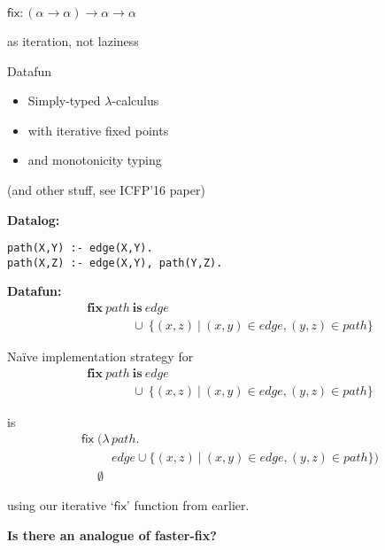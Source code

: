 \documentclass{beamer}
\newcommand{\ms}{\mathsf}
\newcommand{\mb}{\mathbf}
\newcommand{\setfor}[2]{\{#1 ~|~ #2\}}
\begin{document}

\begin{frame}
  \Huge\centering
  $\ms{fix} : (\alpha \to \alpha) \to \alpha \to \alpha$

  \vspace{0.66em}
  \huge
  as iteration, not laziness
\end{frame}

\begin{frame}
  \Huge 
  \begin{center} Datafun \end{center}

  \huge
  \begin{itemize}
  \item Simply-typed $\lambda$-calculus
  \item with iterative fixed points
  \item and monotonicity typing
  \end{itemize}
  \vspace{0.5cm}

  \large (and other stuff, see ICFP'16 paper)
\end{frame}

\begin{frame}[fragile]
  \Large\textbf{Datalog:}
\begin{verbatim}
path(X,Y) :- edge(X,Y).
path(X,Z) :- edge(X,Y), path(Y,Z).
\end{verbatim}
\vspace{0.4cm}

\Large\textbf{Datafun:}
  \[
  \begin{array}{l}
    \mb{fix}~path~\mb{is}~edge\\
    \phantom{\mb{fix}~path}\,\cup~\setfor{(x,z)}{(x,y) \in edge, (y,z) \in path}
  \end{array}
  \]
\end{frame}


\begin{frame}
  \Large
  Na\"ive implementation strategy for
  \[
  \begin{array}{l}
    \mb{fix}~path~\mb{is}~edge\\
    \phantom{\mb{fix}~path}\,\cup~\setfor{(x,z)}{(x,y) \in edge, (y,z) \in path}
  \end{array}
  \]

  is
  \[
  \begin{array}{l}
    \textsf{fix}\; (\lambda\, path.\\
    \phantom{\textsf{fix}\; (\lambda\, } edge \cup \setfor{(x,z)}{(x,y) \in edge, (y,z) \in path})
    \\ \phantom{\textsf{fix}\;}\emptyset
  \end{array}
  \]

  using our iterative `$\mathsf{fix}$' function from earlier.
  \vspace{1em}

  \textbf{Is there an analogue of {\normalfont faster-fix}?}
\end{frame}
\end{document}
